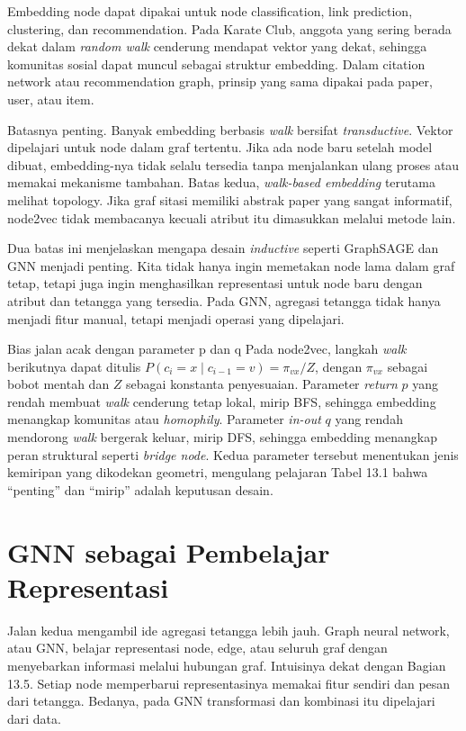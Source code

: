 Embedding node dapat dipakai untuk node classification, link prediction, clustering, dan recommendation. Pada Karate Club, anggota yang sering berada dekat dalam \emph{random walk} cenderung mendapat vektor yang dekat, sehingga komunitas sosial dapat muncul sebagai struktur embedding. Dalam citation network atau recommendation graph, prinsip yang sama dipakai pada paper, user, atau item.

Batasnya penting. Banyak embedding berbasis \emph{walk} bersifat \emph{transductive}. Vektor dipelajari untuk node dalam graf tertentu. Jika ada node baru setelah model dibuat, embedding-nya tidak selalu tersedia tanpa menjalankan ulang proses atau memakai mekanisme tambahan. Batas kedua, \emph{walk-based embedding} terutama melihat topology. Jika graf sitasi memiliki abstrak paper yang sangat informatif, node2vec tidak membacanya kecuali atribut itu dimasukkan melalui metode lain.

Dua batas ini menjelaskan mengapa desain \emph{inductive} seperti GraphSAGE dan GNN menjadi penting. Kita tidak hanya ingin memetakan node lama dalam graf tetap, tetapi juga ingin menghasilkan representasi untuk node baru dengan atribut dan tetangga yang tersedia. Pada GNN, agregasi tetangga tidak hanya menjadi fitur manual, tetapi menjadi operasi yang dipelajari.

\begin{pendalaman}{Bias jalan acak dengan parameter p dan q}
Pada node2vec, langkah \emph{walk} berikutnya dapat ditulis \(P(c_i = x \mid c_{i-1} = v) = \pi_{vx} / Z\), dengan \(\pi_{vx}\) sebagai bobot mentah dan \(Z\) sebagai konstanta penyesuaian. Parameter \emph{return} \(p\) yang rendah membuat \emph{walk} cenderung tetap lokal, mirip BFS, sehingga embedding menangkap komunitas atau \emph{homophily}. Parameter \emph{in-out} \(q\) yang rendah mendorong \emph{walk} bergerak keluar, mirip DFS, sehingga embedding menangkap peran struktural seperti \emph{bridge node}. Kedua parameter tersebut menentukan jenis kemiripan yang dikodekan geometri, mengulang pelajaran Tabel 13.1 bahwa ``penting'' dan ``mirip'' adalah keputusan desain.
\end{pendalaman}

\section{GNN sebagai Pembelajar Representasi}\label{gnn-sebagai-pembelajar-representasi}

Jalan kedua mengambil ide agregasi tetangga lebih jauh. Graph neural network, atau GNN, belajar representasi node, edge, atau seluruh graf dengan menyebarkan informasi melalui hubungan graf. Intuisinya dekat dengan Bagian 13.5. Setiap node memperbarui representasinya memakai fitur sendiri dan pesan dari tetangga. Bedanya, pada GNN transformasi dan kombinasi itu dipelajari dari data.

